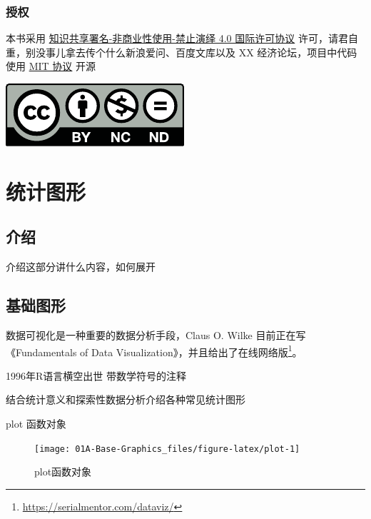 \documentclass[a4paper,oneside,UTF8]{book}
\begin{document}
\hypertarget{licenses}{%
\section*{授权}\label{licenses}}

本书采用 \href{https://creativecommons.org/licenses/by-nc-nd/4.0/}{知识共享署名-非商业性使用-禁止演绎 4.0 国际许可协议} 许可，请君自重，别没事儿拿去传个什么新浪爱问、百度文库以及 XX 经济论坛，项目中代码使用 \href{https://github.com/XiangyunHuang/ISCGwR/blob/master/LICENSE}{MIT 协议} 开源

\begin{flushleft}\includegraphics[width=0.15\linewidth]{images/by-nc-nd} \end{flushleft}

\mainmatter

\hypertarget{Statistical-Graphics}{%
\part{统计图形}\label{Statistical-Graphics}}

\hypertarget{Statistical-Graphics-Intro}{%
\chapter*{介绍}\label{Statistical-Graphics-Intro}}

介绍这部分讲什么内容，如何展开

\hypertarget{Base-Graphics}{%
\chapter{基础图形}\label{Base-Graphics}}

数据可视化是一种重要的数据分析手段，Claus O. Wilke 目前正在写《Fundamentals of Data Visualization》，并且给出了在线网络版\footnote{\url{https://serialmentor.com/dataviz/}}。

1996年R语言横空出世 \citep{Ross1996} 带数学符号的注释 \citep{Paul2000}

结合统计意义和探索性数据分析介绍各种常见统计图形

plot 函数对象

\begin{figure}

{\centering \texttt{[image: 01A-Base-Graphics\_files/figure-latex/plot-1]} 

}

\caption{plot函数对象}\label{fig:plot}
\end{figure}
\end{document}
